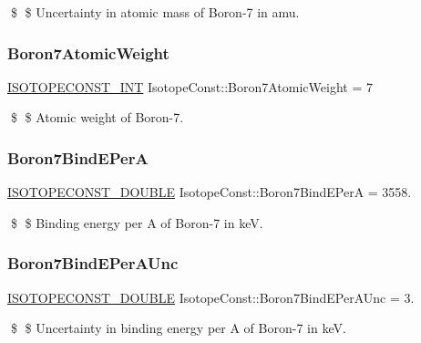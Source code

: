 \$ \$ Uncertainty in atomic mass of Boron-\/7 in amu. \mbox{\label{group___isotope_const-_boron-_b7_ga4c28c36652ff6fb794ca24741a2052af}} 
\subsubsection{\texorpdfstring{Boron7\+Atomic\+Weight}{Boron7AtomicWeight}}
{\footnotesize\ttfamily \mbox{\hyperlink{group___isotope_const-_macros_ga5f18360b3e99483a35c32d789e62621c}{I\+S\+O\+T\+O\+P\+E\+C\+O\+N\+S\+T\+\_\+\+I\+NT}} Isotope\+Const\+::\+Boron7\+Atomic\+Weight = 7}

\$ \$ Atomic weight of Boron-\/7. \mbox{\label{group___isotope_const-_boron-_b7_ga46a7e56bed8364a670f538b2285addb7}} 
\subsubsection{\texorpdfstring{Boron7\+Bind\+E\+PerA}{Boron7BindEPerA}}
{\footnotesize\ttfamily \mbox{\hyperlink{group___isotope_const-_macros_ga8f45a7272ce02c0b4c65c44636ed719a}{I\+S\+O\+T\+O\+P\+E\+C\+O\+N\+S\+T\+\_\+\+D\+O\+U\+B\+LE}} Isotope\+Const\+::\+Boron7\+Bind\+E\+PerA = 3558.}

\$ \$ Binding energy per A of Boron-\/7 in keV. \mbox{\label{group___isotope_const-_boron-_b7_ga94a6715e5b083619213565cc81dbf9ce}} 
\subsubsection{\texorpdfstring{Boron7\+Bind\+E\+Per\+A\+Unc}{Boron7BindEPerAUnc}}
{\footnotesize\ttfamily \mbox{\hyperlink{group___isotope_const-_macros_ga8f45a7272ce02c0b4c65c44636ed719a}{I\+S\+O\+T\+O\+P\+E\+C\+O\+N\+S\+T\+\_\+\+D\+O\+U\+B\+LE}} Isotope\+Const\+::\+Boron7\+Bind\+E\+Per\+A\+Unc = 3.}

\$ \$ Uncertainty in binding energy per A of Boron-\/7 in keV. \mbox{\label{group___isotope_const-_boron-_b7_ga08919581510750a1ea17b08c44d29174}} 
